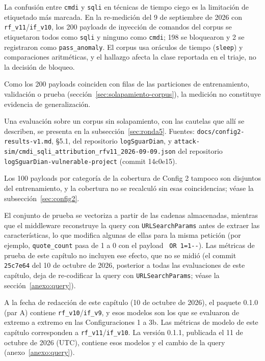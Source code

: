 La confusión entre \texttt{cmdi} y \texttt{sqli} en técnicas de tiempo ciego es la limitación de etiquetado más marcada. En la re-medición del 9 de septiembre de 2026 con \texttt{rf\_v11}/\texttt{if\_v10}, los 200 payloads de inyección de comandos del corpus se etiquetaron todos como \texttt{sqli} y ninguno como \texttt{cmdi}; 198 se bloquearon y 2 se registraron como \texttt{pass\_anomaly}. El corpus usa oráculos de tiempo (\texttt{sleep}) y comparaciones aritméticas, y el hallazgo afecta la clase reportada en el triaje, no la decisión de bloqueo.

Como los 200 payloads coinciden con filas de las particiones de entrenamiento, validación o prueba (sección~\ref{sec:solapamiento-corpus}), la medición no constituye evidencia de generalización. 

Una evaluación sobre un corpus sin solapamiento, con las cautelas que allí se describen, se presenta en la subsección~\ref{sec:ronda5}. Fuentes: \texttt{docs/config2-results-v1.md}, §5.1, del repositorio \texttt{logSguarDian}, y \texttt{attack-sim/cmdi\_sqli\_attribution\_rfv11\_2026-09-09.json} del repositorio \texttt{logSguarDian-vulnerable-project} (commit 14c0e15).

Los 100 payloads por categoría de la cobertura de Config 2 tampoco son disjuntos del entrenamiento, y la cobertura no se recalculó sin esas coincidencias; véase la subsección~\ref{sec:config2}.

El conjunto de prueba se vectoriza a partir de las cadenas almacenadas, mientras que el middleware reconstruye la query con \texttt{URLSearchParams} antes de extraer las características, lo que modifica algunas de ellas para la misma petición (por ejemplo, \texttt{quote\_count} pasa de 1 a 0 con el payload \texttt{\textquotesingle{} OR 1=1-{}-}). Las métricas de prueba de este capítulo no incluyen ese efecto, que no se midió (el commit \texttt{25c7e64} del 10 de octubre de 2026, posterior a todas las evaluaciones de este capítulo, deja de re-codificar la query con \texttt{URLSearchParams}; véase la sección~\ref{anexo:query}).


A la fecha de redacción de este capítulo (10 de octubre de 2026), el paquete 0.1.0 (par A) contiene \texttt{rf\_v10}/\texttt{if\_v9}, y esos modelos son los que se evaluaron de extremo a extremo en las Configuraciones 1 a 3b. Las métricas de modelo de este capítulo corresponden a \texttt{rf\_v11}/\texttt{if\_v10}. La versión 0.1.1, publicada el 11 de octubre de 2026 (UTC), contiene esos modelos y el cambio de la query (anexo~\ref{anexo:query}).
